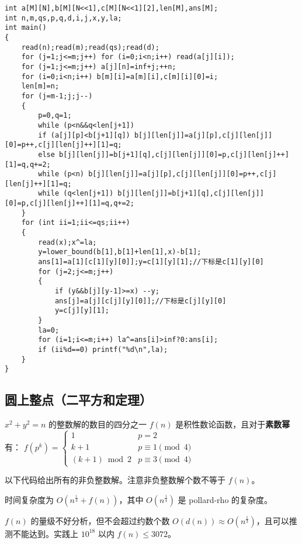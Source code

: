 \documentclass[12pt]{ctexart}
\begin{document}
\begin{lstlisting}
int a[M][N],b[M][N<<1],c[M][N<<1][2],len[M],ans[M];
int n,m,qs,p,q,d,i,j,x,y,la;
int main()
{
	read(n);read(m);read(qs);read(d);
	for (j=1;j<=m;j++) for (i=0;i<n;i++) read(a[j][i]);
	for (j=1;j<=m;j++) a[j][n]=inf+j;++n;
	for (i=0;i<n;i++) b[m][i]=a[m][i],c[m][i][0]=i;
	len[m]=n;
	for (j=m-1;j;j--)
	{
		p=0,q=1;
		while (p<n&&q<len[j+1]) 
		if (a[j][p]<b[j+1][q]) b[j][len[j]]=a[j][p],c[j][len[j]][0]=p++,c[j][len[j]++][1]=q;
		else b[j][len[j]]=b[j+1][q],c[j][len[j]][0]=p,c[j][len[j]++][1]=q,q+=2;
		while (p<n) b[j][len[j]]=a[j][p],c[j][len[j]][0]=p++,c[j][len[j]++][1]=q;
		while (q<len[j+1]) b[j][len[j]]=b[j+1][q],c[j][len[j]][0]=p,c[j][len[j]++][1]=q,q+=2;
	}
	for (int ii=1;ii<=qs;ii++)
	{
		read(x);x^=la;
		y=lower_bound(b[1],b[1]+len[1],x)-b[1];
		ans[1]=a[1][c[1][y][0]];y=c[1][y][1];//下标是c[1][y][0]
		for (j=2;j<=m;j++) 
		{
			if (y&&b[j][y-1]>=x) --y;
			ans[j]=a[j][c[j][y][0]];//下标是c[j][y][0]
			y=c[j][y][1];
		}
		la=0;
		for (i=1;i<=m;i++) la^=ans[i]>inf?0:ans[i];
		if (ii%d==0) printf("%d\n",la);
	}
}
\end{lstlisting}

\subsection{圆上整点（二平方和定理）}

$x^2+y^2=n$ 的整数解的数目的四分之一 $f(n)$ 是积性数论函数，且对于{\bf{素数幂}}有：
$f(p^k)=\begin{cases}
		1            & p=2               \\
		k+1          & p\equiv 1 \pmod 4 \\
		(k+1)\bmod 2 & p\equiv 3 \pmod 4
	\end{cases}$

以下代码给出所有的非负整数解。注意非负整数解个数不等于 $f(n)$。

时间复杂度为 $O(n^{\frac{1}{4}}+f(n))$，其中 $O(n^{\frac{1}{4}})$ 是 pollard-rho 的复杂度。

$f(n)$ 的量级不好分析，但不会超过约数个数 $O(d(n))\approx O(n^{\frac{1}{3}})$，且可以推测不能达到。实践上 $10^{18}$ 以内 $f(n)\le 3072$。
\end{document}
